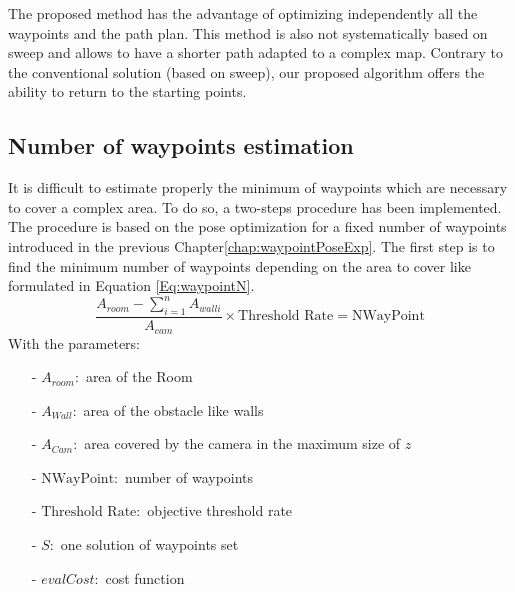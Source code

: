 The proposed method has the advantage of optimizing independently all the waypoints and the path plan. This method is also not systematically based on sweep and allows to have a shorter path adapted to a complex map. 
Contrary to the conventional solution (based on sweep), our proposed  algorithm offers the ability to  return to the starting points. %


\subsection{Number of waypoints estimation}\label{sec:NmbWaypoint}

It is difficult to estimate properly the minimum of waypoints which are necessary to cover a complex area.
To do so, a two-steps procedure has been implemented. The procedure is based on the pose optimization for a fixed number of waypoints introduced in the previous Chapter\ref{chap:waypointPoseExp}. 
The first step is to find the minimum number of waypoints depending on the area to cover like formulated in Equation \ref{Eq:waypointN}. \\
\begin{equation}\label{Eq:waypointN}
\frac{ A_{room} - \sum_{i=1}^n A_{wall i} }{A_{cam}} \times \mbox{Threshold Rate} = \mbox{NWayPoint}
\end{equation}
With the parameters:
\begin{itemize}
\item[-] $ A_{room}: $  area of the Room %
\item[-] $ A_{Wall}: $  area of the obstacle like walls %
\item[-] $ A_{Cam}: $   area covered by the camera in the maximum size of $z$
\item[-] $ \mbox{NWayPoint}: $  number of waypoints
\item[-] $ \mbox{Threshold Rate}: $ objective threshold rate 
\item[-] $S:$ one solution of waypoints set 
\item[-] $evalCost:$ cost function  
\end{itemize}

